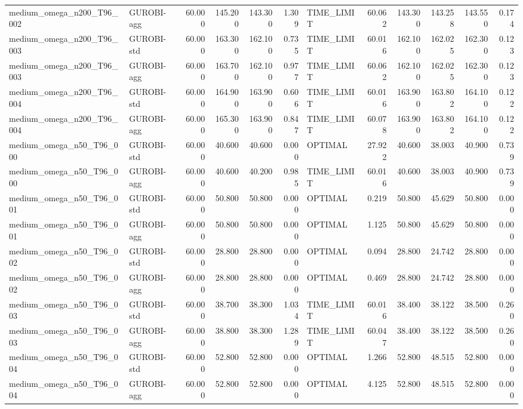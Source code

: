 \begin{table}[htbp]
\begin{tabular}{llrrrrlrrrrr}
medium\_omega\_n200\_T96\_002 & GUROBI-agg & 60.000 & 145.200 & 143.300 & 1.309 & TIME\_LIMIT & 60.062 & 143.300 & 143.258 & 143.550 & 0.174 \\
medium\_omega\_n200\_T96\_003 & GUROBI-std & 60.000 & 163.300 & 162.100 & 0.735 & TIME\_LIMIT & 60.016 & 162.100 & 162.025 & 162.300 & 0.123 \\
medium\_omega\_n200\_T96\_003 & GUROBI-agg & 60.000 & 163.700 & 162.100 & 0.977 & TIME\_LIMIT & 60.062 & 162.100 & 162.025 & 162.300 & 0.123 \\
medium\_omega\_n200\_T96\_004 & GUROBI-std & 60.000 & 164.900 & 163.900 & 0.606 & TIME\_LIMIT & 60.016 & 163.900 & 163.802 & 164.100 & 0.122 \\
medium\_omega\_n200\_T96\_004 & GUROBI-agg & 60.000 & 165.300 & 163.900 & 0.847 & TIME\_LIMIT & 60.078 & 163.900 & 163.802 & 164.100 & 0.122 \\
medium\_omega\_n50\_T96\_000 & GUROBI-std & 60.000 & 40.600 & 40.600 & 0.000 & OPTIMAL & 27.922 & 40.600 & 38.003 & 40.900 & 0.739 \\
medium\_omega\_n50\_T96\_000 & GUROBI-agg & 60.000 & 40.600 & 40.200 & 0.985 & TIME\_LIMIT & 60.016 & 40.600 & 38.003 & 40.900 & 0.739 \\
medium\_omega\_n50\_T96\_001 & GUROBI-std & 60.000 & 50.800 & 50.800 & 0.000 & OPTIMAL & 0.219 & 50.800 & 45.629 & 50.800 & 0.000 \\
medium\_omega\_n50\_T96\_001 & GUROBI-agg & 60.000 & 50.800 & 50.800 & 0.000 & OPTIMAL & 1.125 & 50.800 & 45.629 & 50.800 & 0.000 \\
medium\_omega\_n50\_T96\_002 & GUROBI-std & 60.000 & 28.800 & 28.800 & 0.000 & OPTIMAL & 0.094 & 28.800 & 24.742 & 28.800 & 0.000 \\
medium\_omega\_n50\_T96\_002 & GUROBI-agg & 60.000 & 28.800 & 28.800 & 0.000 & OPTIMAL & 0.469 & 28.800 & 24.742 & 28.800 & 0.000 \\
medium\_omega\_n50\_T96\_003 & GUROBI-std & 60.000 & 38.700 & 38.300 & 1.034 & TIME\_LIMIT & 60.016 & 38.400 & 38.122 & 38.500 & 0.260 \\
medium\_omega\_n50\_T96\_003 & GUROBI-agg & 60.000 & 38.800 & 38.300 & 1.289 & TIME\_LIMIT & 60.047 & 38.400 & 38.122 & 38.500 & 0.260 \\
medium\_omega\_n50\_T96\_004 & GUROBI-std & 60.000 & 52.800 & 52.800 & 0.000 & OPTIMAL & 1.266 & 52.800 & 48.515 & 52.800 & 0.000 \\
medium\_omega\_n50\_T96\_004 & GUROBI-agg & 60.000 & 52.800 & 52.800 & 0.000 & OPTIMAL & 4.125 & 52.800 & 48.515 & 52.800 & 0.000 \\

\end{tabular}
\end{table}
